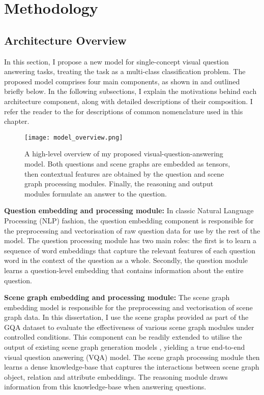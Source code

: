 \chapter{Methodology}
\label{chapter:methodology}

\section{Architecture Overview}
\label{section:architecture_overview}

In this section, I propose a new model for single-concept visual question answering tasks, treating the task as a multi-class classification problem. The proposed model comprises four main components, as shown in \figureautorefname{ \ref{fig:model_overview}} and outlined briefly below. In the following subsections, I explain the motivations behind each architecture component, along with detailed descriptions of their composition. I refer the reader to the  for descriptions of common nomenclature used in this chapter.


\begin{figure}[htbp]
    \centering
    \texttt{[image: model\_overview.png]}
    \caption[An overview of my proposed visual-question-answering model.]{A high-level overview of my proposed visual-question-answering model. Both questions and scene graphs are embedded as tensors, then contextual features are obtained by the question and scene graph processing modules. Finally, the reasoning and output modules formulate an answer to the question.}
    \label{fig:model_overview}
\end{figure}

\textbf{Question embedding and processing module:} In classic Natural Language Processing (NLP) fashion, the question embedding component is responsible for the preprocessing and vectorisation of raw question data for use by the rest of the model. The question processing module has two main roles: the first is to learn a sequence of word embeddings that capture the relevant features of each question word in the context of the question as a whole. Secondly, the question module learns a question-level embedding that contains information about the entire question.

\textbf{Scene graph embedding and processing module:} The scene graph embedding model is responsible for the preprocessing and vectorisation of scene graph data. In this dissertation, I use the scene graphs provided as part of the GQA dataset to evaluate the effectiveness of various scene graph modules under controlled conditions. This component can be readily extended to utilise the output of existing scene graph generation models \cite{yang2018graph, li2019relation}, yielding a true end-to-end visual question answering (VQA) model. The scene graph processing module then learns a dense knowledge-base that captures the interactions between scene graph object, relation and attribute embeddings. The reasoning module draws information from this knowledge-base when answering questions.

